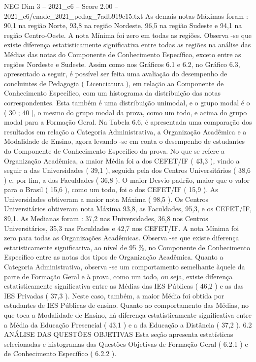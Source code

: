 \begin{textsample}{NEG Dim 3 – 2021\_c6 – Score 2.00 – 2021\_c6/enade\_2021\_pedag\_7adb919c15.txt}
As demais notas Máximas foram : 90,1 na região Norte, 93,8 na região Nordeste, 96,5 na região Sudeste e 94,1 na região Centro-Oeste.
A nota Mínima foi zero em todas as regiões.
Observa -se que existe diferença estatisticamente significativa entre todas as regiões na análise das Médias das notas do Componente de Conhecimento Específico, exceto entre as regiões Nordeste e Sudeste.
Assim como nos Gráficos 6.1 e 6.2, no Gráfico 6.3, apresentado a seguir, é possível ser feita uma avaliação do desempenho de concluintes de Pedagogia ( Licenciatura ), em relação ao Componente de Conhecimento Específico, com um histograma da distribuição das notas correspondentes.
Esta também é uma distribuição unimodal, e o grupo modal é o ( 30 ; 40 ], o mesmo do grupo modal da prova, como um todo, e acima do grupo modal para a Formação Geral.
Na Tabela 6.6, é apresentada uma comparação dos resultados em relação a Categoria Administrativa, a Organização Acadêmica e a Modalidade de Ensino, agora levando -se em conta o desempenho de estudantes do Componente de Conhecimento Específico da prova.
No que se refere a Organização Acadêmica, a maior Média foi a dos CEFET/IF ( 43,3 ), vindo a seguir a das Universidades ( 39,1 ), seguida pela dos Centros Universitários ( 38,6 ) e, por fim, a das Faculdades ( 36,8 ).
O maior Desvio padrão, maior que o valor para o Brasil ( 15,6 ), como um todo, foi o dos CEFET/IF ( 15,9 ).
As Universidades obtiveram a maior nota Máxima ( 98,5 ).
Os Centros Universitários obtiveram nota Máxima 93,8, as Faculdades, 95,3, e os CEFET/IF, 89,1.
As Medianas foram : 37,2 nas Universidades, 36,8 nos Centros Universitários, 35,3 nas Faculdades e 42,7 nos CEFET/IF.
A nota Mínima foi zero para todas as Organizações Acadêmicas.
Observa -se que existe diferença estatisticamente significativa, ao nível de 95 \%, no Componente de Conhecimento Específico entre as notas dos tipos de Organização Acadêmica.
Quanto a Categoria Administrativa, observa -se um comportamento semelhante àquele da parte de Formação Geral e à prova, como um todo, ou seja, existe diferença estatisticamente significativa entre as Médias das IES Públicas ( 46,2 ) e as das IES Privadas ( 37,3 ).
Neste caso, também, a maior Média foi obtida por estudantes de IES Públicas de ensino.
Quanto ao comportamento das Médias, no que toca a Modalidade de Ensino, há diferença estatisticamente significativa entre a Média da Educação Presencial ( 43,1 ) e a da Educação a Distância ( 37,2 ). 6.2 ANÁLISE DAS QUESTÕES OBJETIVAS Esta seção apresenta estatísticas selecionadas e histogramas das Questões Objetivas de Formação Geral ( 6.2.1 ) e de Conhecimento Específico ( 6.2.2 ).

\end{textsample}
